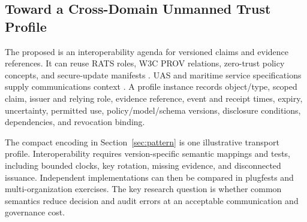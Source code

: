 \subsection{Toward a Cross-Domain Unmanned Trust Profile}

The proposed \CDUTP{} is an interoperability agenda for versioned claims and evidence references. It can reuse RATS roles, W3C PROV relations, zero-trust policy concepts, and secure-update manifests \citep{birkholz2023remote,w3c2013provo,rose2020zero,ietf2020suit}. UAS and maritime service specifications supply communications context \citep{threegpp22125,threegpp22119}. A profile instance records object/type, scoped claim, issuer and relying role, evidence reference, event and receipt times, expiry, uncertainty, permitted use, policy/model/schema versions, disclosure conditions, dependencies, and revocation binding.

The compact encoding in Section~\ref{sec:pattern} is one illustrative transport profile. Interoperability requires version-specific semantic mappings and tests, including bounded clocks, key rotation, missing evidence, and disconnected issuance. Independent implementations can then be compared in plugfests and multi-organization exercises. The key research question is whether common semantics reduce decision and audit errors at an acceptable communication and governance cost.
